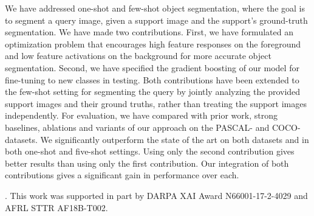 \documentclass[10pt,twocolumn,letterpaper]{article}
\begin{document}
We have addressed one-shot and few-shot object segmentation, where the goal is to segment a query image, given a support image and the support's ground-truth segmentation. We have made two contributions. First, we have formulated an optimization problem that encourages high feature responses on the foreground and low feature activations on the background for more accurate object segmentation. Second, we have specified the gradient boosting of our model for fine-tuning to new classes in testing. Both contributions have been extended to the few-shot setting for segmenting the query by jointly analyzing the provided support images and their ground truths, rather than treating the support images independently. For evaluation, we have compared with prior work, strong baselines, ablations and variants of our approach on the PASCAL- and COCO- datasets. We significantly outperform the state of the art on both datasets and in both one-shot and five-shot settings. Using only the second contribution gives better results than using only the first contribution. Our integration of both contributions gives a significant gain in performance over each. 



. This work was supported in part by DARPA XAI Award N66001-17-2-4029 and AFRL STTR AF18B-T002.
\pagebreak

\pagebreak

{\small


}
\end{document}
